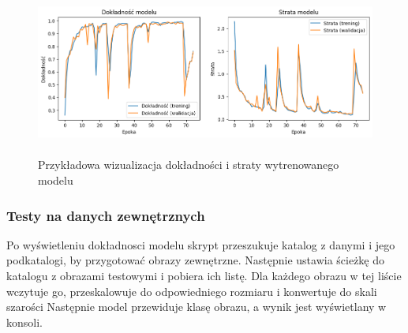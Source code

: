 \begin{figure}[ht]
	\centering
	\includegraphics[height=5.5cm]{resources/tests/images/v2_epoch75.png}
	\caption{Przykładowa wizualizacja dokładności i straty wytrenowanego modelu}
	\label{Fig:tests-wyniki-1}
\end{figure}
\FloatBarrier

\subsubsection{Testy na danych zewnętrznych}
Po wyświetleniu dokładnosci modelu skrypt przeszukuje katalog z danymi i jego podkatalogi, by przygotować obrazy zewnętrzne.
Następnie ustawia ścieżkę do katalogu z obrazami testowymi i pobiera ich listę.
Dla każdego obrazu w tej liście wczytuje go, przeskalowuje do odpowiedniego rozmiaru i konwertuje do skali szarości
Następnie model przewiduje klasę obrazu, a wynik jest wyświetlany w konsoli.
